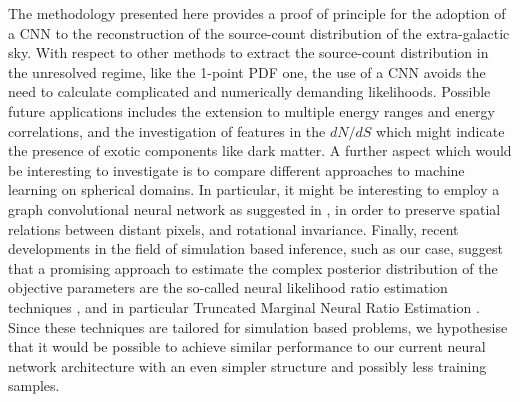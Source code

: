  The methodology presented here provides a proof of principle for the adoption of a CNN to the reconstruction of the source-count distribution of the extra-galactic sky. 
With respect to other methods to extract the source-count distribution in the unresolved regime, like the 1-point PDF one, the use of a CNN avoids the need to calculate complicated and numerically demanding likelihoods.
 Possible future applications includes the extension to multiple energy ranges and energy correlations, and the investigation of features in the $dN/dS$ which might indicate the presence of exotic components like dark matter.
A further aspect which would be interesting to investigate is to compare different approaches to machine learning on spherical domains. In particular, it might be interesting to employ a graph convolutional neural network as suggested in \cite{DBLP:journals/corr/abs-2012-15000}, in order to preserve spatial relations between distant pixels, and rotational invariance.
Finally, recent developments in the field of simulation based inference, such as our case, suggest that a promising approach to estimate the complex posterior distribution of the objective parameters are the so-called neural likelihood ratio estimation techniques \cite{Durkan2020}, and in particular Truncated Marginal Neural Ratio Estimation \cite{Miller2021arxiv,Miller2021,AnauMontel:2022ppb}. Since these techniques are tailored for simulation based problems, we hypothesise that it would be possible to achieve similar performance to our current neural network architecture with an even simpler structure and possibly less training samples. 
 
 

\label{sec:dnds:conclusions}

